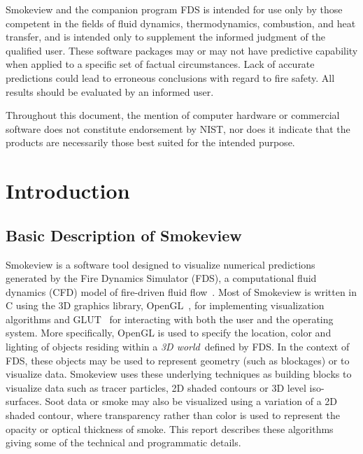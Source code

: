 \documentclass[11pt,twoside]{book}
\begin{document}
Smokeview and the companion program FDS is intended for use only
by those competent in the fields of fluid dynamics,
thermodynamics, combustion, and heat transfer, and is intended
only to supplement the informed judgment of the qualified user.
These software packages may or may not have predictive capability
when applied to a specific set of factual circumstances. Lack of
accurate predictions could lead to erroneous conclusions with
regard to fire safety. All results should be evaluated by an
informed user.

Throughout this document, the mention of computer hardware or
commercial software does not constitute endorsement by NIST, nor
does it indicate that the products are necessarily those best
suited for the intended purpose.

%
%



\tableofcontents
\listoffigures

\mainmatter


%
%

\chapter{Introduction}
\section{Basic Description of Smokeview}
Smokeview is a software tool designed to visualize numerical
predictions generated by the Fire Dynamics Simulator (FDS), a
computational fluid dynamics (CFD) model of fire-driven fluid
flow~\cite{FDS_Tech_Guide,FDS_Users_Guide}. Most of Smokeview is
written in C using the 3D graphics library,
OpenGL~\cite{OpenGLRed}, for implementing visualization algorithms
and GLUT~\cite{OpenGLGlut} for interacting with both the user and
the operating system. More specifically, OpenGL is used to specify
the location, color and lighting of objects residing within a {\em
3D world}\ defined by FDS. In the context of FDS, these objects
may be used to represent geometry (such as blockages) or to
visualize data. Smokeview uses these underlying techniques as
building blocks to visualize data such as tracer particles, 2D
shaded contours or 3D level iso-surfaces.  Soot data or smoke may
also be visualized using a variation of a 2D shaded contour, where
transparency rather than color is used to represent the opacity or
optical thickness of smoke. This report describes these algorithms
giving some of the technical and programmatic details.
\end{document}
